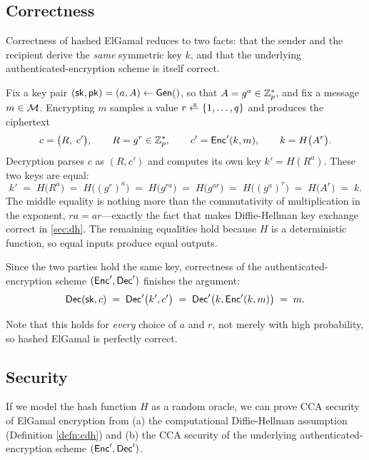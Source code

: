 \subsection{Correctness}
Correctness of hashed ElGamal reduces to two facts: that the sender and
the recipient derive the \emph{same} symmetric key $k$, and that the
underlying authenticated-encryption scheme is itself correct.

Fix a key pair $({\mathsf{sk}}, \mathsf{pk}) = (a, A) \gets \mathsf{Gen}()$, so that $A = g^a \in
\mathbb{Z}_p^*$, and fix a message $m \in \mathcal{M}$.  Encrypting $m$ samples a
value $r \getsr \{1, \dots, q\}$ and produces the ciphertext
\[
  c = \big(R,\; c'\big), \qquad
  R = g^r \in \mathbb{Z}_p^*, \qquad
  c' = \mathsf{Enc}'(k, m), \qquad
  k = H\big(A^r\big).
\]
Decryption parses $c$ as $(R, c')$ and computes its own key
$k' = H(R^a)$.  These two keys are equal:
\[
  k' \;=\; H\big(R^{a}\big)
     \;=\; H\big((g^{r})^{a}\big)
     \;=\; H\big(g^{ra}\big)
     \;=\; H\big(g^{ar}\big)
     \;=\; H\big((g^{a})^{r}\big)
     \;=\; H\big(A^{r}\big)
     \;=\; k.
\]
The middle equality is nothing more than the commutativity of
multiplication in the exponent, $ra = ar$---exactly the fact that makes
Diffie-Hellman key exchange correct in \cref{sec:dh}.  The remaining
equalities hold because $H$ is a deterministic function, so equal inputs
produce equal outputs.

Since the two parties hold the same key, correctness of the
authenticated-encryption scheme $(\mathsf{Enc}', \mathsf{Dec}')$ finishes the argument:
\[
  \mathsf{Dec}({\mathsf{sk}}, c)
    \;=\; \mathsf{Dec}'\big(k', c'\big)
    \;=\; \mathsf{Dec}'\big(k, \mathsf{Enc}'(k, m)\big)
    \;=\; m.
\]

Note that this holds for \emph{every} choice of $a$ and $r$, not merely
with high probability, so hashed ElGamal is perfectly
correct.

\subsection{Security}
If we model the hash function $H$ as a random oracle, 
we can prove CCA security of ElGamal encryption from 
(a) the computational Diffie-Hellman assumption (Definition \ref{defn:cdh}) and
(b) the CCA security of the underlying authenticated-encryption
scheme $(\mathsf{Enc}', \mathsf{Dec}')$.

